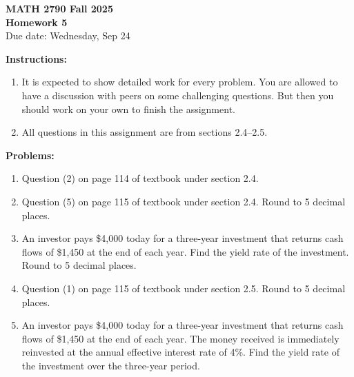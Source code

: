 \documentclass[12pt]{article}
\begin{document}
\begin{center}
\textbf{\Large MATH 2790 Fall 2025}\\[1em]
\textbf{\Large Homework 5}\\[0.5em]
Due date: Wednesday, Sep 24
\end{center}

\bigskip

\textbf{Instructions:}

\begin{enumerate}[label=(\alph*)]
\item It is expected to show detailed work for every problem. You are allowed to have a
discussion with peers on some challenging questions. But then you should work on
your own to finish the assignment.

\item All questions in this assignment are from sections 2.4--2.5.
\end{enumerate}

\bigskip

\textbf{Problems:}

\begin{enumerate}
\item Question (2) on page 114 of textbook under section 2.4.

\item Question (5) on page 115 of textbook under section 2.4. Round to 5 decimal places.

\item An investor pays \$4{,}000 today for a three-year investment that returns cash flows of
\$1{,}450 at the end of each year. Find the yield rate of the investment. Round to 5
decimal places.

\item Question (1) on page 115 of textbook under section 2.5. Round to 5 decimal places.

\item An investor pays \$4{,}000 today for a three-year investment that returns cash flows
of \$1{,}450 at the end of each year. The money received is immediately reinvested at
the annual effective interest rate of 4\%. Find the yield rate of the investment over
the three-year period.
\end{enumerate}
\end{document}
